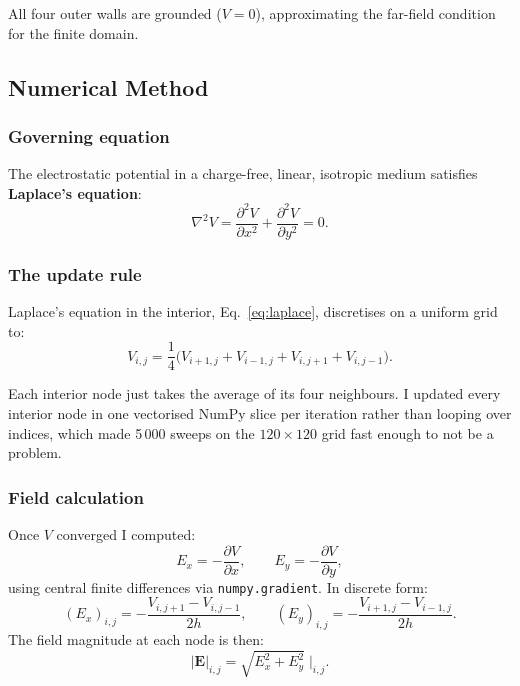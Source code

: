 \documentclass[11pt,a4paper]{article}
\begin{document}
All four outer walls are grounded ($V=0$), approximating the far-field condition for the finite domain.

\subsection{Numerical Method}

\subsubsection{Governing equation}

The electrostatic potential in a charge-free, linear, isotropic medium satisfies \textbf{Laplace's equation}:
\begin{equation}
\nabla^2 V = \frac{\partial^2 V}{\partial x^2} + \frac{\partial^2 V}{\partial y^2} = 0.
\label{eq:laplace}
\end{equation}

\subsubsection{The update rule}

Laplace's equation in the interior, Eq.~\eqref{eq:laplace}, discretises on a uniform grid to:
\begin{equation}
\boxed{\;V_{i,j} = \frac{1}{4}\bigl(V_{i+1,j} + V_{i-1,j} + V_{i,j+1} + V_{i,j-1}\bigr).\;}
\label{eq:fivepoint}
\end{equation}

Each interior node just takes the average of its four neighbours. I updated every interior node in one vectorised NumPy slice per iteration rather than looping over indices, which made 5\,000 sweeps on the $120 \times 120$ grid fast enough to not be a problem.

\subsubsection{Field calculation}

Once $V$ converged I computed:
\begin{equation}
E_x = -\frac{\partial V}{\partial x}, \qquad E_y = -\frac{\partial V}{\partial y},
\end{equation}
using central finite differences via \texttt{numpy.gradient}. In discrete form:
\begin{equation}
(E_x)_{i,j} = -\frac{V_{i,j+1} - V_{i,j-1}}{2h}, \qquad
(E_y)_{i,j} = -\frac{V_{i+1,j} - V_{i-1,j}}{2h}.
\end{equation}
The field magnitude at each node is then:
\begin{equation}
|\mathbf{E}|_{i,j} = \sqrt{E_x^2 + E_y^2}\;\Big|_{i,j}.
\end{equation}
\end{document}
